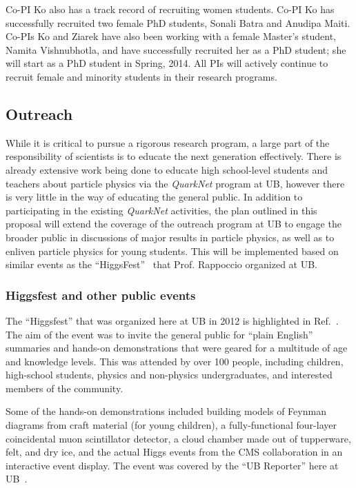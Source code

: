 \documentclass[times,11pt]{article}
\begin{document}
Co-PI Ko also has a track record of recruiting women students. Co-PI Ko has
successfully recruited two female PhD students, Sonali Batra and Anudipa
Maiti. Co-PIs Ko and Ziarek have also been working with a female Master's
student, Namita Vishnubhotla, and have successfully recruited her as a PhD
student; she will start as a PhD student in Spring, 2014. All PIs will
actively continue to recruit female and minority students in their research
programs.

\subsection{Outreach}

While it is critical to pursue a rigorous research program, a large
part of the responsibility of scientists is to educate the next
generation effectively. There is already extensive work being done to
educate high school-level students and teachers about particle physics
via the {\em QuarkNet}
program  at UB, however there is
very little in the way of educating the general
public. 
In addition to participating in the existing {\em QuarkNet}
activities, the plan outlined in this proposal will extend the coverage of the
outreach program at UB to engage the broader
public in discussions of major results in particle
physics, as well as to enliven particle physics for young students. 
This will be implemented based on similar events as the
``HiggsFest''~\cite{higgsfest} that Prof. Rappoccio organized at UB. 


\subsubsection{Higgsfest and other public events}

The ``Higgsfest'' that was organized here at UB in 2012
is highlighted in Ref.~\cite{higgsfest}. The aim of the event was to
invite the general public for ``plain English'' summaries and hands-on
demonstrations that were geared for a multitude of age and knowledge
levels. 
This was attended by over 100 people, including children,
high-school students, physics and non-physics undergraduates, and
interested members of the community. 

Some of the hands-on demonstrations included building models of
Feynman diagrams from craft material (for young children), a
fully-functional four-layer coincidental muon scintillator detector,
a cloud chamber made out of tupperware, felt, and dry ice, and the
actual Higgs events from the CMS collaboration in an interactive event
display. 
The event was covered by the ``UB Reporter'' here at
UB~\cite{higgsfest_ubreporter}. 
\end{document}
